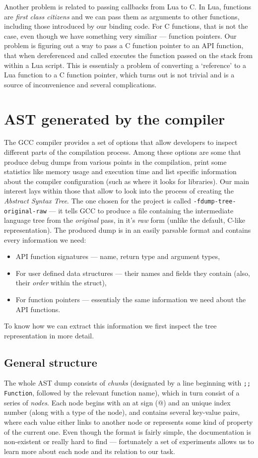 \documentclass[polish, english]{iithesis}
\begin{document}
    Another problem is related to passing callbacks from Lua to C.
    In Lua, functions are \textit{first class citizens} and we can pass them as arguments to other functions, including those introduced by our binding code.
    For C functions, that is not the case, even though we have something very similiar --- function pointers.
    Our problem is figuring out a way to pass a C function pointer to an API function, that when dereferenced and called executes the function passed on the stack from within a Lua script.
    This is essentialy a problem of converting a `reference' to a Lua function to a C function pointer, which turns out is not trivial and is a source of inconvenience and several complications. 

\chapter{AST generated by the compiler}
The GCC compiler provides a set of options that allow developers to inspect different parts of the compilation process.
Among these options are some that produce debug dumps from various points in the compilation, print some statistics like memory usage and execution time and list specific information about the compiler configuration (such as where it looks for libraries).
Our main interest lays within those that allow to look into the process of creating the \textit{Abstract Syntax Tree}.
The one chosen for the project is called \texttt{-fdump-tree-original-raw} --- it tells GCC to produce a file containing the intermediate language tree from the \textit{original} pass, in it's \textit{raw} form (unlike the default, C-like representation). 
The produced dump is in an easily parsable format and contains every information we need:
\begin{itemize}
  \item API function signatures --- name, return type and argument types,
  \item For user defined data structures --- their names and fields they contain (also, their \textit{order} within the struct),
  \item For function pointers --- essentialy the same information we need about the API functions.
\end{itemize}
To know how we can extract this information we first inspect the tree representation in more detail.
  \section{General structure}
The whole AST dump consists of \textit{chunks} (designated by a line beginning with \texttt{;; Function}, followed by the relevant function name), which in turn consist of a series of \textit{nodes}.
Each node begins with an at sign (@) and an unique index number (along with a type of the node), and contains several key-value pairs, where each value either links to another node or represents some kind of property of the current one.
Even though the format is fairly simple, the documentation is non-existent or really hard to find --- fortunately a set of experiments allows us to learn more about each node and its relation to our task. 
\end{document}
